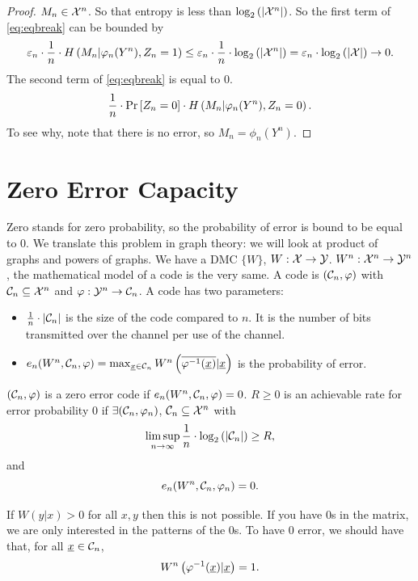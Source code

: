 \begin{proof}
	$M_n \in \mathcal{X}^n$.
	So that entropy is less than $\log_2 \left( {\left|{\mathcal{X}^n}\right|} \right)$.
	So the first term of \cref{eq:eqbreak} can be bounded by
	\begin{equation*}
		\varepsilon_n \cdot
		\frac{1}{n} \cdot
		H\left({M_n | \varphi_n(Y^n), Z_n = 1}\right) \le
		\varepsilon_n \cdot
		\frac{1}{n} \cdot
		\log_2 \left( {\left|{\mathcal{X}^n}\right|} \right) =
		\varepsilon_n \cdot \log_2 \left( {\left|{\mathcal{X}}\right|} \right) \to 0.
	\end{equation*}
	The second term of \cref{eq:eqbreak} is equal to 0.
	\begin{equation*}
		\frac{1}{n} \cdot \mathop{\mathrm{Pr}}\limits_{} \left[ {Z_n = 0} \right] \cdot H\left({M_n | \varphi_n(Y^n), Z_n = 0}\right).
	\end{equation*}
	To see why, note that there is no error, so $M_n = \phi_n(Y^n)$.
\end{proof}


\section{Zero Error Capacity}

Zero stands for zero probability, so the probability of error is bound to be equal to 0.
We translate this problem in graph theory: we will look
at product of graphs and powers of graphs.
We have a \ac{DMC} $\{W\}$, $W : \mathcal{X} \to \mathcal{Y}$.
$W^n : \mathcal{X}^n \to \mathcal{Y}^n$, the mathematical model of a code is the very same.
A code is $(\mathcal{C}_n, \varphi)$ with $\mathcal{C}_n \subseteq \mathcal{X}^n$ and $\varphi: \mathcal{Y}^n \to \mathcal{C}_n$.
A code has two parameters:
\begin{itemize}
	\item $\frac{1}{n} \cdot \left|{\mathcal{C}_n}\right|$ is the size of the code compared to $n$.
		It is the number of bits transmitted over the channel per use of the channel.
	\item $e_n(W^n, \mathcal{C}_n, \varphi) = \max_{\underline{x} \in \mathcal{C}_n} W^n \left( \overline{\varphi^{-1}(\underline{x})} | \underline{x} \right)$ is the probability of error.
\end{itemize}

$(\mathcal{C}_n, \varphi)$ is a zero error code if $e_n(W^n, \mathcal{C}_n, \varphi) = 0$.
$R \geq 0$ is an achievable rate for error probability $0$ if $\exists (\mathcal{C}_n, \varphi_n)$, $\mathcal{C}_n \subseteq \mathcal{X}^n$ with
\begin{equation*}
	\limsup_{n \to \infty} \frac{1}{n} \cdot \log_2 \left( {\left|{\mathcal{C}_n}\right|} \right) \ge R,
\end{equation*}
and
\begin{equation*}
	e_n(W^n, \mathcal{C}_n, \varphi_n) = 0.
\end{equation*}

If $W(y|x) > 0$ for all $x, y$ then this is not possible.
If you have 0s in the matrix, we are only interested in the patterns of the 0s.
To have 0 error, we should have that, for all $\underline{x} \in \mathcal{C}_n$,
\begin{equation*}
	W^n \left( \varphi^{-1}(\underline{x}) | \underline{x} \right) = 1.
\end{equation*}


